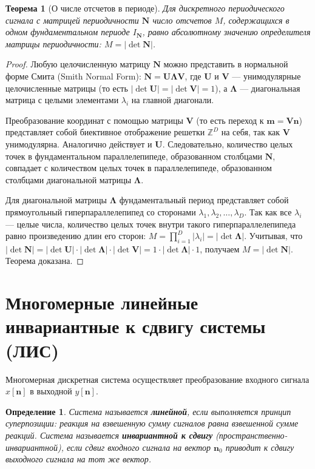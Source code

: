 \documentclass[12pt,a4paper]{article}
\newtheorem{theorem}{Теорема}
\newtheorem{definition}{Определение}
\begin{document}
\begin{theorem}[О числе отсчетов в периоде]
Для дискретного периодического сигнала с матрицей периодичности $\mathbf{N}$ число отсчетов $M$, содержащихся в одном фундаментальном периоде $I_{\mathbf{N}}$, равно абсолютному значению определителя матрицы периодичности: $M = |\det \mathbf{N}|$.
\end{theorem}

\begin{proof}
Любую целочисленную матрицу $\mathbf{N}$ можно представить в нормальной форме Смита (Smith Normal Form):
$ \mathbf{N} = \mathbf{U} \mathbf{\Lambda} \mathbf{V} $,
где $\mathbf{U}$ и $\mathbf{V}$ — унимодулярные целочисленные матрицы (то есть $|\det \mathbf{U}| = |\det \mathbf{V}| = 1$), а $\mathbf{\Lambda}$ — диагональная матрица с целыми элементами $\lambda_i$ на главной диагонали.

Преобразование координат с помощью матрицы $\mathbf{V}$ (то есть переход к $\mathbf{m} = \mathbf{V}\mathbf{n}$) представляет собой биективное отображение решетки $\mathbb{Z}^D$ на себя, так как $\mathbf{V}$ унимодулярна. Аналогично действует и $\mathbf{U}$. Следовательно, количество целых точек в фундаментальном параллелепипеде, образованном столбцами $\mathbf{N}$, совпадает с количеством целых точек в параллелепипеде, образованном столбцами диагональной матрицы $\mathbf{\Lambda}$.

Для диагональной матрицы $\mathbf{\Lambda}$ фундаментальный период представляет собой прямоугольный гиперпараллелепипед со сторонами $\lambda_1, \lambda_2, \dots, \lambda_D$. Так как все $\lambda_i$ — целые числа, количество целых точек внутри такого гиперпараллелепипеда равно произведению длин его сторон:
$ M = \prod_{i=1}^D |\lambda_i| = |\det \mathbf{\Lambda}| $.
Учитывая, что $|\det \mathbf{N}| = |\det \mathbf{U}| \cdot |\det \mathbf{\Lambda}| \cdot |\det \mathbf{V}| = 1 \cdot |\det \mathbf{\Lambda}| \cdot 1$, получаем $M = |\det \mathbf{N}|$. Теорема доказана.
\end{proof}

\section{Многомерные линейные инвариантные к сдвигу системы (ЛИС)}

Многомерная дискретная система осуществляет преобразование входного сигнала $x[\mathbf{n}]$ в выходной $y[\mathbf{n}]$.

\begin{definition}
Система называется \textbf{линейной}, если выполняется принцип суперпозиции: реакция на взвешенную сумму сигналов равна взвешенной сумме реакций. Система называется \textbf{инвариантной к сдвигу} (пространственно-инвариантной), если сдвиг входного сигнала на вектор $\mathbf{n}_0$ приводит к сдвигу выходного сигнала на тот же вектор.
\end{definition}
\end{document}
